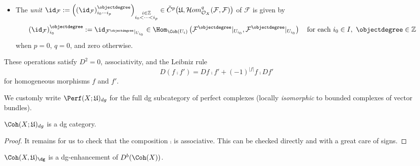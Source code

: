 \begin{dfn}
\begin{itemize}
\item
The \emph{unit}
$
\id_{\mathcal{F}}
:=
\left(\left(\id_{\mathcal{F}}\right)_{i_0\cdots i_p}^{\objectdegree}\right)_{
\substack{
i\in\mathbb{Z}
\\
i_0<\cdots<i_p
}
}
\in
\check{C}^p\big(
\mathfrak{U},\mathcal{H}om_{\mathcal{O}_X}^q(\mathcal{F},\mathcal{F})
\big)
$
of $\mathcal F$ is given by
$$
\left(\id_{\mathcal{F}}\right)_{i_0}^{\objectdegree}
:=
\id_{\mathcal{F}^{\objectdegree}|_{U_{i_0}}}
\in
\Hom_{\Coh(U_{i})}\left(\mathcal{F}^{\objectdegree}|_{U_{i_0}},\mathcal{F}^{\objectdegree}|_{U_{i_0}}\right)
\quad\text{for each }
i_0\in I,\
\objectdegree\in\mathbb{Z}
$$
when
$p=0$, $q=0$,
and
zero otherwise.
\end{itemize}

These operations satisfy $D^2=0$, associativity,
and the Leibniz rule
$$
D(f\comp f')
=
Df\comp f'+(-1)^{|f|}f\comp Df'
$$
for homogeneous morphisms $f$ and $f'$.
\end{dfn}
We customly write $\Perf (X;\mathfrak{U})_{dg}$ for the full dg subcategory of perfect complexes (locally \emph{isomorphic} to bounded complexes of vector bundles).
\begin{prp}\label{prp:verifying-dg}
    $\Coh (X;\mathfrak{U})_{dg}$ is a dg category.
\end{prp}
\begin{proof}
    It remains for us to check that the composition $\comp$ is associative. This can be checked directly and with a great care of signs.
\end{proof}
\begin{prp}\label{prp:dg-enhancement}
$\Coh(X,\mathfrak{U})_{\dg}$
is a dg-enhancement of $D^b(\Coh(X))$.
\end{prp}
